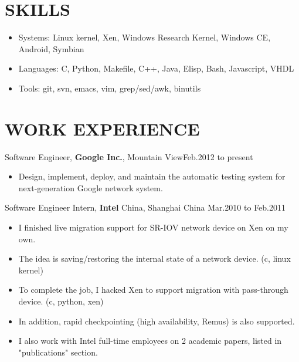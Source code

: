 \documentclass[11pt]{res} %
\begin{document}
 
 

\address{{\bf PRESENT ADDRESS} \\ 1600 Villa St. APT 223 \\ Mountain View, CA 94041}

\address{{\bf CONTACTS} \\ Email:
  \href{mailto:frankpzh@gmail.com}{frankpzh@gmail.com} \\ Mobile:
  (+1) 650-336-3774 \\ Blog: \href{http://frankpzh.wordpress.com/}{http://frankpzh.wordpress.com/}}

\begin{resume}

\section{SKILLS}

\begin{itemize} \itemsep -2pt
\item Systems: Linux kernel, Xen, Windows Research Kernel, Windows CE, Android, Symbian
\item Languages: C, Python, Makefile, C++, Java, Elisp, Bash, Javascript, VHDL
\item Tools: git, svn, emacs, vim, grep/sed/awk, binutils
\end{itemize} 

\section{WORK EXPERIENCE}
Software Engineer, \textbf{Google Inc.}, Mountain View\hfill Feb.2012 to present
\begin{itemize} \itemsep -2pt
\item Design, implement, deploy, and maintain the automatic testing
  system for next-generation Google network system.
\end{itemize}

Software Engineer Intern, \textbf{Intel} China, Shanghai China \hfill Mar.2010 to Feb.2011
\begin{itemize} \itemsep -2pt
\item I finished live migration support for SR-IOV network device on Xen on my own.
\item The idea is saving/restoring the internal state of a network device. (c, linux kernel)
\item To complete the job, I hacked Xen to support migration with pass-through device. (c, python, xen)
\item In addition, rapid checkpointing (high availability, Remus) is also supported.
\item I also work with Intel full-time employees on 2 academic papers, listed in "publications" section.
\end{itemize} 


\end{resume}
\end{document}
